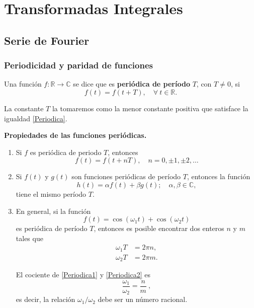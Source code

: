 \chapter{Transformadas Integrales}

\section{Serie de Fourier}

\subsection{Periodicidad y paridad de funciones}


\begin{defi} 
Una función $f: \mathbb{R} \to \mathbb{C} $ se dice que es \textbf{periódica de período} $T$, con $T\neq 0$, si 
\begin{equation} \label{Periodica}
    \boxed{
f(t) = f(t + T), \quad \forall \ t \in \mathbb{R}.}    
\end{equation}



La constante $T$ la tomaremos como la  menor constante positiva que satisface la igualdad \eqref{Periodica}.
\end{defi}


\begin{propiedad} 
    \textbf{Propiedades de las funciones periódicas.}
    \begin{enumerate}
        \item Si $f$ es periódica de periodo $T$, entonces $$f(t) = f(t + nT), \quad n = 0, \pm 1, \pm 2, \dots$$
        
        \item Si $f(t)$ y $g(t)$ son funciones periódicas de período $T$, entonces la función
        $$h(t) = \alpha f(t) + \beta g(t); \quad \alpha, \beta \in \mathbb{C},$$
        tiene el mismo período $T$.
    
        \item En general, si la función 
        $$f(t) = \cos (\omega_1 t) + \cos (\omega_2 t)$$
        es periódica de período $T$, entonces es posible encontrar dos enteros $n$ y $m$ tales que 
        \begin{align}
            \omega_1 T &= 2\pi n,  \label{Periodica1}\\
             \omega_2 T &= 2\pi m. \label{Periodica2}
        \end{align}
        
        El cociente de \eqref{Periodica1} y \eqref{Periodica2} es
        $$\frac{\omega_1}{\omega_2} = \frac{n}{m} \ ,$$
        es decir, la relación $\omega_1/ \omega_2$ debe ser un número racional.
    \end{enumerate}
\end{propiedad}


